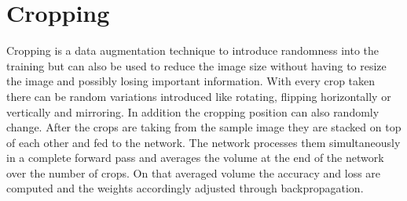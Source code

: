 \begin{table}[h]
    \caption{Different data set variations. C stands for cleaned, CH stands fro cleaned heavily, B stands for balanced and EXTENDED stand for the variation where the validation images have additionally been copied into the training.}
    \centering
    \begin{small}
    \textsc{
    }
    \end{small}
    \vspace{-3.9mm}
    \label{tbl:dataset-variations}
\end{table}

\section{Cropping}

Cropping is a data augmentation technique to introduce randomness into the training but can also be used to reduce the image size without having to resize the image and possibly losing important information. With every crop taken there can be random variations introduced like rotating, flipping horizontally or vertically and mirroring. In addition the cropping position can also randomly change. After the crops are taking from the sample image they are stacked on top of each other and fed to the network. The network processes them simultaneously in a complete forward pass and averages the volume at the end of the network over the number of crops. On that averaged volume the accuracy and loss are computed and the weights accordingly adjusted through backpropagation.

